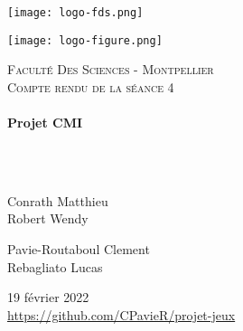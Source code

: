 \documentclass[a4paper, 12pt]{article}
\begin{document}
\begin{titlepage}
  \begin{sffamily}
  \begin{center}
  

\begin{minipage}[c]{.46\linewidth}
     \begin{center}
             \texttt{[image: logo-fds.png]}
         \end{center}
   \end{minipage} \hfill
   \begin{minipage}[c]{.46\linewidth}
    \begin{center}
            \texttt{[image: logo-figure.png]}
        \end{center}
 \end{minipage}
    \newline \newline

    \textsc{\LARGE Faculté Des Sciences - Montpellier}\\[2cm]

    \textsc{\Large Compte rendu de la séance 4}\\[1.5cm]

    \HRule \\[0.4cm]
    { \huge \bfseries Projet CMI\\[0.4cm] }

    \HRule \\[2cm]
    \\[2cm]

    \begin{minipage}{0.4\textwidth}
      \begin{flushleft} \large
        Conrath Matthieu\\
        Robert Wendy\\
      \end{flushleft}
    \end{minipage}
    \begin{minipage}{0.4\textwidth}
      \begin{flushright} \large
       Pavie-Routaboul Clement\\
        Rebagliato Lucas\\
      \end{flushright}
    \end{minipage}

    \vfill
    {\large 19 février 2022}
    \\
    {\url{https://github.com/CPavieR/projet-jeux}}

  \end{center}
  \end{sffamily}
\end{titlepage}
\end{document}
